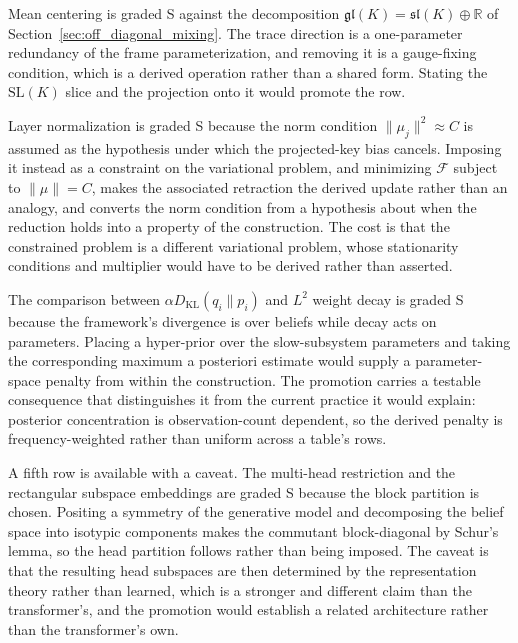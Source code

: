 \documentclass[twoside,11pt]{article}
\newcommand{\KL}{\operatorname{KL}}
\begin{document}
Mean centering is graded S against the decomposition $\mathfrak{gl}(K) = \mathfrak{sl}(K) \oplus \mathbb{R}$ of Section~\ref{sec:off_diagonal_mixing}. The trace direction is a one-parameter redundancy of the frame parameterization, and removing it is a gauge-fixing condition, which is a derived operation rather than a shared form. Stating the $\mathrm{SL}(K)$ slice and the projection onto it would promote the row.

Layer normalization is graded S because the norm condition $\|\mu_j\|^2 \approx C$ is assumed as the hypothesis under which the projected-key bias cancels. Imposing it instead as a constraint on the variational problem, and minimizing $\mathcal{F}$ subject to $\|\mu\| = C$, makes the associated retraction the derived update rather than an analogy, and converts the norm condition from a hypothesis about when the reduction holds into a property of the construction. The cost is that the constrained problem is a different variational problem, whose stationarity conditions and multiplier would have to be derived rather than asserted.

The comparison between $\alpha D_{\KL}(q_i \| p_i)$ and $L^2$ weight decay is graded S because the framework's divergence is over beliefs while decay acts on parameters. Placing a hyper-prior over the slow-subsystem parameters and taking the corresponding maximum a posteriori estimate would supply a parameter-space penalty from within the construction. The promotion carries a testable consequence that distinguishes it from the current practice it would explain: posterior concentration is observation-count dependent, so the derived penalty is frequency-weighted rather than uniform across a table's rows.

A fifth row is available with a caveat. The multi-head restriction and the rectangular subspace embeddings are graded S because the block partition is chosen. Positing a symmetry of the generative model and decomposing the belief space into isotypic components makes the commutant block-diagonal by Schur's lemma, so the head partition follows rather than being imposed. The caveat is that the resulting head subspaces are then determined by the representation theory rather than learned, which is a stronger and different claim than the transformer's, and the promotion would establish a related architecture rather than the transformer's own.
\end{document}
